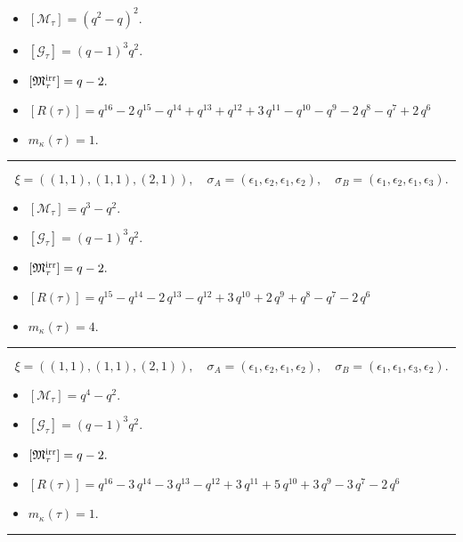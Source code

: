 \documentclass[10pt,a4paper]{amsart}
\begin{document}
\begin{itemize}
 \item $[\mathcal{M}_{\tau}] = {\left(q^{2} - q\right)}^{2} .$

 \item $[\mathcal{G}_{\tau}] = {\left(q - 1\right)}^{3} q^{2} .$

 \item $[{\frak M}_{\tau}^{\textrm{irr}}] = q - 2 .$

 \item $[R(\tau)] = q^{16} - 2 \, q^{15} - q^{14} + q^{13} + q^{12} + 3 \, q^{11} - q^{10} - q^{9} - 2 \, q^{8} - q^{7} + 2 \, q^{6} $

 \item $m_{\kappa}(\tau) = 1 .$

 \end{itemize}
\noindent\rule{8cm}{0.4pt}

$$\xi = ({(1, 1), (1, 1)}, {(2, 1)}),\quad \sigma_A = ({{\epsilon_1}, {\epsilon_2}}, {{\epsilon_1, \epsilon_2}}),\quad \sigma_B = ({{\epsilon_1}, {\epsilon_2}}, {{\epsilon_1, \epsilon_3}}).$$

\begin{itemize}
 \item $[\mathcal{M}_{\tau}] = q^{3} - q^{2} .$

 \item $[\mathcal{G}_{\tau}] = {\left(q - 1\right)}^{3} q^{2} .$

 \item $[{\frak M}_{\tau}^{\textrm{irr}}] = q - 2 .$

 \item $[R(\tau)] = q^{15} - q^{14} - 2 \, q^{13} - q^{12} + 3 \, q^{10} + 2 \, q^{9} + q^{8} - q^{7} - 2 \, q^{6} $

 \item $m_{\kappa}(\tau) = 4 .$

 \end{itemize}
\noindent\rule{8cm}{0.4pt}

$$\xi = ({(1, 1), (1, 1)}, {(2, 1)}),\quad \sigma_A = ({{\epsilon_1}, {\epsilon_2}}, {{\epsilon_1, \epsilon_2}}),\quad \sigma_B = ({{\epsilon_1}, {\epsilon_1}}, {{\epsilon_3, \epsilon_2}}).$$

\begin{itemize}
 \item $[\mathcal{M}_{\tau}] = q^{4} - q^{2} .$

 \item $[\mathcal{G}_{\tau}] = {\left(q - 1\right)}^{3} q^{2} .$

 \item $[{\frak M}_{\tau}^{\textrm{irr}}] = q - 2 .$

 \item $[R(\tau)] = q^{16} - 3 \, q^{14} - 3 \, q^{13} - q^{12} + 3 \, q^{11} + 5 \, q^{10} + 3 \, q^{9} - 3 \, q^{7} - 2 \, q^{6} $

 \item $m_{\kappa}(\tau) = 1 .$

 \end{itemize}
\noindent\rule{8cm}{0.4pt}
\end{document}
